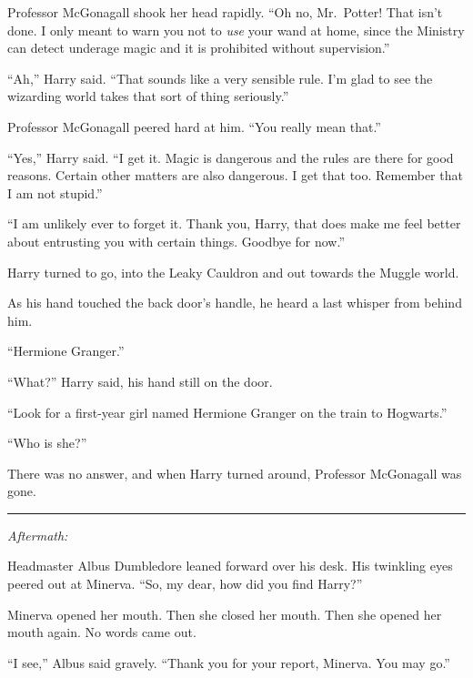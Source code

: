Professor McGonagall shook her head rapidly. ``Oh no, Mr.~Potter! That
isn't done. I only meant to warn you not to \emph{use} your wand at
home, since the Ministry can detect underage magic and it is prohibited
without supervision.''

``Ah,'' Harry said. ``That sounds like a very sensible rule. I'm glad to
see the wizarding world takes that sort of thing seriously.''

Professor McGonagall peered hard at him. ``You really mean that.''

``Yes,'' Harry said. ``I get it. Magic is dangerous and the rules are
there for good reasons. Certain other matters are also dangerous. I get
that too. Remember that I am not stupid.''

``I am unlikely ever to forget it. Thank you, Harry, that does make me
feel better about entrusting you with certain things. Goodbye for now.''

Harry turned to go, into the Leaky Cauldron and out towards the Muggle
world.

As his hand touched the back door's handle, he heard a last whisper from
behind him.

``Hermione Granger.''

``What?'' Harry said, his hand still on the door.

``Look for a first-year girl named Hermione Granger on the train to
Hogwarts.''

``Who is she?''

There was no answer, and when Harry turned around, Professor McGonagall
was gone.

\begin{center}\rule{3in}{0.4pt}\end{center}

\emph{Aftermath:}

Headmaster Albus Dumbledore leaned forward over his desk. His twinkling
eyes peered out at Minerva. ``So, my dear, how did you find Harry?''

Minerva opened her mouth. Then she closed her mouth. Then she opened her
mouth again. No words came out.

``I see,'' Albus said gravely. ``Thank you for your report, Minerva. You
may go.''
